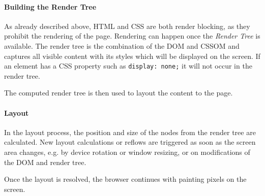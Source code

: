 



\paragraph{Building the Render Tree}


As already described above, HTML and CSS are both render blocking, as they prohibit the rendering of the page.
Rendering can happen once the \textit{Render Tree} is available.
The render tree is the combination of the DOM and CSSOM and captures all visible content with its styles which will be displayed on the screen.
If an element has a CSS property such as \verb|display: none;| it will not occur in the render tree. %

The computed render tree is then used to layout the content to the page.








\paragraph{Layout}


In the layout process, the position and size of the nodes from the render tree are calculated.
New layout calculations or reflows are triggered as soon as the screen area changes, e.g. by device rotation or window resizing, or on modifications of the DOM and render tree. %

Once the layout is resolved, the browser continues with painting pixels on the screen.






